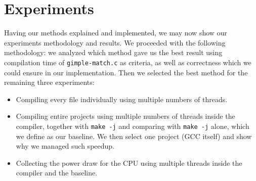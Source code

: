 %
%
%
%
%
%
%

\chapter{Experiments}

Having our methods explained and implemented, we may now show our experiments
methodology and results. We proceeded with the following methodology: we
analyzed which method gave us the best result using compilation time of
\texttt{gimple-match.c} as criteria, as well as correctness which we could
ensure in our implementation. Then we selected the best method for the
remaining three experiments:
\begin{itemize}
  \item Compiling every file individually using multiple numbers of threads.
  \item Compiling entire projects using multiple numbers of threads inside the
	compiler, together with \texttt{make -j} and comparing with \texttt{make -j} alone,
	which we define as our baseline. We then select one project (GCC itself) and
	show why we managed such speedup.
  \item Collecting the power draw for the CPU using multiple threads inside the
compiler and the baseline.
\end{itemize}

